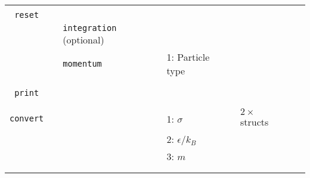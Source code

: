 \documentclass[11pt]{article}
\begin{document}
\begin{center}
\begin{tabular}{cclclclll}
    \hline
                                   && && && \\
	  \verb!reset! && && && \\
	  && \verb!integration! (optional) && && \\ 
	  && \verb!momentum! && 1: Particle type && \\
                                 && && && \\
    \hline
                                   && && && \\
   \verb!print! & & && && \\
                                   && && && \\
    \hline
                                && && && \\
    \verb!convert! && && 1: $\sigma$ && $2\times$ structs \\
    $\mbox{}$  && && 2: $\epsilon/k_B$ && \\
    $\mbox{}$  && && 3: $m$ && \\
                                   && && && \\
    \hline
                                   && && && \\
  \end{tabular}

\end{center}
\end{document}
